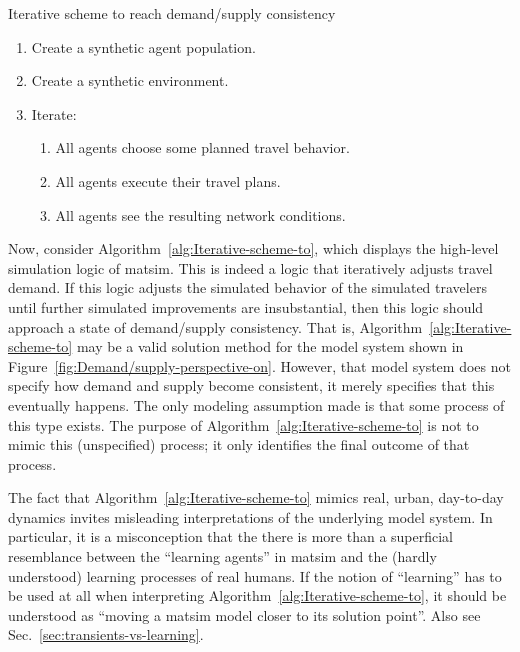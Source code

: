 \begin{algorithm}
\caption{\label{alg:Iterative-scheme-to}Iterative scheme to reach demand/supply
consistency}

\begin{enumerate}
\item Create a synthetic agent population.
\item Create a synthetic environment.
\item Iterate:

\begin{enumerate}
\item All agents choose some planned travel behavior.
\item All agents execute their travel plans.
\item All agents see the resulting network conditions.\end{enumerate}
\end{enumerate}
\end{algorithm}


Now, consider Algorithm~\ref{alg:Iterative-scheme-to}, which displays
the high-level simulation logic of \gls{matsim}. This is indeed a logic
that iteratively adjusts travel demand. If this logic adjusts the
simulated behavior of the simulated travelers until further simulated
improvements are insubstantial, then this logic should
approach a state of demand/supply consistency. That is, Algorithm~\ref{alg:Iterative-scheme-to}
may be a valid solution method for the model system shown in Figure~\ref{fig:Demand/supply-perspective-on}.
However, that model system does not specify how demand and supply
become consistent, it merely specifies that this eventually happens.
The only modeling assumption made is that some process of this type
exists. The purpose of Algorithm~\ref{alg:Iterative-scheme-to} is
not to mimic this (unspecified) process; it only identifies the final
outcome of that process.

The fact that Algorithm~\ref{alg:Iterative-scheme-to} 
mimics real, urban, day-to-day dynamics invites misleading interpretations
of the underlying model system. In particular, it is a misconception
that the there is more than a superficial resemblance between the
{}``learning agents'' in \gls{matsim} and the (hardly understood) learning
processes of real humans. If the notion of {}``learning'' has to
be used at all when interpreting Algorithm~\ref{alg:Iterative-scheme-to},
it should be understood as {}``moving a \gls{matsim} model closer to its
solution point''.  Also see Sec.~\ref{sec:transients-vs-learning}.

